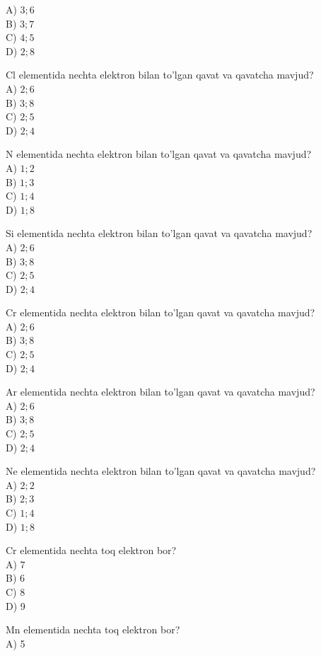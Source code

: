 A) $3 ; 6$\\
B) $3 ; 7$\\
C) $4 ; 5$\\
D) $2 ; 8$
  \item Cl elementida nechta elektron bilan to'lgan qavat va qavatcha mavjud?\\
A) $2 ; 6$\\
B) $3 ; 8$\\
C) $2 ; 5$\\
D) $2 ; 4$
  \item N elementida nechta elektron bilan to'lgan qavat va qavatcha mavjud?\\
A) $1 ; 2$\\
B) $1 ; 3$\\
C) $1 ; 4$\\
D) $1 ; 8$
  \item Si elementida nechta elektron bilan to'lgan qavat va qavatcha mavjud?\\
A) $2 ; 6$\\
B) $3 ; 8$\\
C) $2 ; 5$\\
D) $2 ; 4$
  \item Cr elementida nechta elektron bilan to'lgan qavat va qavatcha mavjud?\\
A) $2 ; 6$\\
B) $3 ; 8$\\
C) $2 ; 5$\\
D) $2 ; 4$
  \item Ar elementida nechta elektron bilan to'lgan qavat va qavatcha mavjud?\\
A) $2 ; 6$\\
B) $3 ; 8$\\
C) $2 ; 5$\\
D) $2 ; 4$
  \item Ne elementida nechta elektron bilan to'lgan qavat va qavatcha mavjud?\\
A) $2 ; 2$\\
B) $2 ; 3$\\
C) $1 ; 4$\\
D) $1 ; 8$
  \item Cr elementida nechta toq elektron bor?\\
A) 7\\
B) 6\\
C) 8\\
D) 9\\
  \item Mn elementida nechta toq elektron bor?\\
A) 5\\
